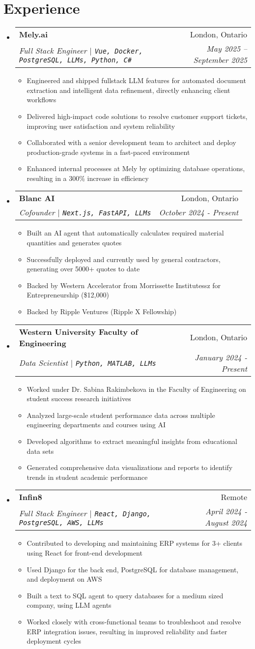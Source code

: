 \documentclass[letterpaper,10pt]{article}
\makeatletter
\newcommand{\resumeItem}[1]{
  \item\small{
    {#1 \vspace{-2pt}}
  }
}
\newcommand{\resumeSubheading}[4]{
  \vspace{-2pt}\item
    \begin{tabular*}{0.97\textwidth}[t]{l@{\extracolsep{\fill}}r}
      \textbf{#1} & #2 \\
      \textit{\small#3} & \textit{\small #4} \\
    \end{tabular*}\vspace{-7pt}
}
\newcommand{\resumeSubHeadingListStart}{\begin{itemize}[leftmargin=0.15in, label={}]}
\newcommand{\resumeSubHeadingListEnd}{\end{itemize}}
\newcommand{\resumeItemListStart}{\begin{itemize}}
\newcommand{\resumeItemListEnd}{\end{itemize}\vspace{-5pt}}
\makeatother
\begin{document}
\section{Experience}
\resumeSubHeadingListStart
  \resumeSubheading
    {Mely.ai}{London, Ontario}
    {Full Stack Engineer $|$ \textup{\texttt{Vue, Docker, PostgreSQL, LLMs, Python, C\#}}}{May 2025 -- September 2025}
    \resumeItemListStart
      \resumeItem{Engineered and shipped fullstack LLM features for automated document extraction and intelligent data refinement, directly enhancing client workflows}
      \resumeItem{Delivered high-impact code solutions to resolve customer support tickets, improving user satisfaction and system reliability}
      \resumeItem{Collaborated with a senior development team to architect and deploy production-grade systems in a fast-paced environment}
      \resumeItem{Enhanced internal processes at Mely by optimizing database operations, resulting in a 300\% increase in efficiency}
    \resumeItemListEnd
  \resumeSubheading
    {Blanc AI}{London, Ontario}
    {Cofounder $|$ \textup{\texttt{Next.js, FastAPI, LLMs}}}{October 2024 - Present}
    \resumeItemListStart
      \resumeItem{Built an AI agent that automatically calculates required material quantities and generates quotes}
      \resumeItem{Successfully deployed and currently used by general contractors, generating over 5000+ quotes to date}
      \resumeItem{Backed by Western Accelerator from Morrissette Institutessz for Entrepreneurship (\$12,000)}
      \resumeItem{Backed by Ripple Ventures (Ripple X Fellowship)}
    \resumeItemListEnd
  
  \resumeSubheading
    {Western University Faculty of Engineering}{London, Ontario}
    {Data Scientist $|$ \textup{\texttt{Python, MATLAB, LLMs}}}{January 2024 - Present}
    \resumeItemListStart
      \resumeItem{Worked under Dr. Sabina Rakimbekova in the Faculty of Engineering on student success research initiatives}
      \resumeItem{Analyzed large-scale student performance data across multiple engineering departments and courses using AI}
      \resumeItem{Developed algorithms to extract meaningful insights from educational data sets}
      \resumeItem{Generated comprehensive data visualizations and reports to identify trends in student academic performance}
    \resumeItemListEnd

  \resumeSubheading
    {Infin8}{Remote}
    {Full Stack Engineer $|$ \textup{\texttt{React, Django, PostgreSQL, AWS, LLMs}}}{April 2024 - August 2024}
    \resumeItemListStart
      \resumeItem{Contributed to developing and maintaining ERP systems for 3+ clients using React for front-end development}
      \resumeItem{Used Django for the back end, PostgreSQL for database management, and deployment on AWS}
      \resumeItem{Built a text to SQL agent to query databases for a medium sized company, using LLM agents}
      \resumeItem{Worked closely with cross-functional teams to troubleshoot and resolve ERP integration issues, resulting in improved reliability and faster deployment cycles}
    \resumeItemListEnd
\resumeSubHeadingListEnd
\end{document}
